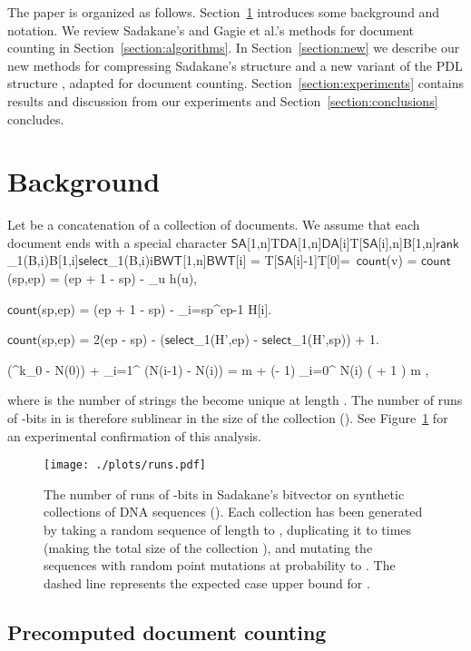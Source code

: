 \documentclass[11pt]{llncs}
\newcommand{\SA}{\ensuremath{\mathsf{SA}}}
\newcommand{\DA}{\ensuremath{\mathsf{DA}}}
\newcommand{\BWT}{\ensuremath{\mathsf{BWT}}}
\newcommand{\mcount}{\ensuremath{\mathsf{count}}}
\newcommand{\mrank}{\ensuremath{\mathsf{rank}}}
\newcommand{\mselect}{\ensuremath{\mathsf{select}}}
\newcommand{\onebit}{\nobreakdash-bit}
\begin{document}
The paper is organized as follows. Section~\ref{section:background} introduces some background and notation. We review Sadakane's and Gagie et al.'s methods for document counting in Section~\ref{section:algorithms}. In Section~\ref{section:new} we describe our new methods for compressing Sadakane's structure and a new variant of the PDL structure \cite{NPS2014}, adapted for document counting. Section~\ref{section:experiments} contains results and discussion from our experiments and Section~\ref{section:conclusions} concludes.

\section{Background}\label{section:background}

Let  be a concatenation of a collection of  documents. We assume that each document ends with a special character \SA[1,n]T\DA[1,n]\DA[i]T[\SA[i],n]B[1,n]\mrank_{1}(B,i)B[1,i]\mselect_{1}(B,i)i\BWT[1,n]\BWT[i] = T[\SA[i]-1]T[0]=\
\mcount(v) = \mcount(sp,ep) = (ep + 1 - sp) - \sum_{u} h(u),

\mcount(sp,ep) = (ep + 1 - sp) - \sum_{i=sp}^{ep-1} H[i].

\mcount(sp,ep) = 2(ep - sp) - (\mselect_{1}(H',ep) - \mselect_{1}(H',sp)) + 1.

(\sigma^{k_{0}} - N(0)) + \sum_{i=1}^{\infty} (\sigma N(i-1) - N(i)) =
m  + (\sigma - 1) \sum_{i=0}^{\infty} N(i) \le
\left(  + 1 \right) m \sqrt{d},

where  is the number of strings the become unique at length .
The number of runs of \onebit{}s in  is therefore sublinear in the size of the
collection (). See Figure~\ref{figure:runs} for an experimental confirmation of this analysis.

\begin{figure}[t]
\texttt{[image: ./plots/runs.pdf]}

\caption{The number of runs of -bits in Sadakane's bitvector  on synthetic collections of DNA sequences (). Each collection has been generated by taking a random sequence of length  to , duplicating it  to  times (making the total size of the collection ), and mutating the sequences with random point mutations at probability  to . The dashed line represents the expected case upper bound for .}\label{figure:runs}
\end{figure}

\subsection{Precomputed document counting}
\end{document}
